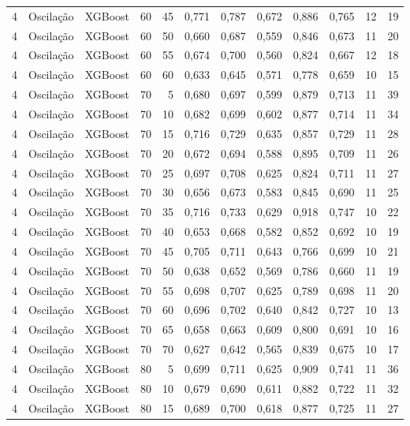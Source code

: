 \begin{longtable}{@{}rllrrrrrrrrr@{}}
4 & Oscilação & XGBoost & 60 & 45 & 0,771 & 0,787 & 0,672 & 0,886 & 0,765 & 12 & 19 \\
4 & Oscilação & XGBoost & 60 & 50 & 0,660 & 0,687 & 0,559 & 0,846 & 0,673 & 11 & 20 \\
4 & Oscilação & XGBoost & 60 & 55 & 0,674 & 0,700 & 0,560 & 0,824 & 0,667 & 12 & 18 \\
4 & Oscilação & XGBoost & 60 & 60 & 0,633 & 0,645 & 0,571 & 0,778 & 0,659 & 10 & 15 \\
4 & Oscilação & XGBoost & 70 & 5 & 0,680 & 0,697 & 0,599 & 0,879 & 0,713 & 11 & 39 \\
4 & Oscilação & XGBoost & 70 & 10 & 0,682 & 0,699 & 0,602 & 0,877 & 0,714 & 11 & 34 \\
4 & Oscilação & XGBoost & 70 & 15 & 0,716 & 0,729 & 0,635 & 0,857 & 0,729 & 11 & 28 \\
4 & Oscilação & XGBoost & 70 & 20 & 0,672 & 0,694 & 0,588 & 0,895 & 0,709 & 11 & 26 \\
4 & Oscilação & XGBoost & 70 & 25 & 0,697 & 0,708 & 0,625 & 0,824 & 0,711 & 11 & 27 \\
4 & Oscilação & XGBoost & 70 & 30 & 0,656 & 0,673 & 0,583 & 0,845 & 0,690 & 11 & 25 \\
4 & Oscilação & XGBoost & 70 & 35 & 0,716 & 0,733 & 0,629 & 0,918 & 0,747 & 10 & 22 \\
4 & Oscilação & XGBoost & 70 & 40 & 0,653 & 0,668 & 0,582 & 0,852 & 0,692 & 10 & 19 \\
4 & Oscilação & XGBoost & 70 & 45 & 0,705 & 0,711 & 0,643 & 0,766 & 0,699 & 10 & 21 \\
4 & Oscilação & XGBoost & 70 & 50 & 0,638 & 0,652 & 0,569 & 0,786 & 0,660 & 11 & 19 \\
4 & Oscilação & XGBoost & 70 & 55 & 0,698 & 0,707 & 0,625 & 0,789 & 0,698 & 11 & 20 \\
4 & Oscilação & XGBoost & 70 & 60 & 0,696 & 0,702 & 0,640 & 0,842 & 0,727 & 10 & 13 \\
4 & Oscilação & XGBoost & 70 & 65 & 0,658 & 0,663 & 0,609 & 0,800 & 0,691 & 10 & 16 \\
4 & Oscilação & XGBoost & 70 & 70 & 0,627 & 0,642 & 0,565 & 0,839 & 0,675 & 10 & 17 \\
4 & Oscilação & XGBoost & 80 & 5 & 0,699 & 0,711 & 0,625 & 0,909 & 0,741 & 11 & 36 \\
4 & Oscilação & XGBoost & 80 & 10 & 0,679 & 0,690 & 0,611 & 0,882 & 0,722 & 11 & 32 \\
4 & Oscilação & XGBoost & 80 & 15 & 0,689 & 0,700 & 0,618 & 0,877 & 0,725 & 11 & 27 \\

\end{longtable}
